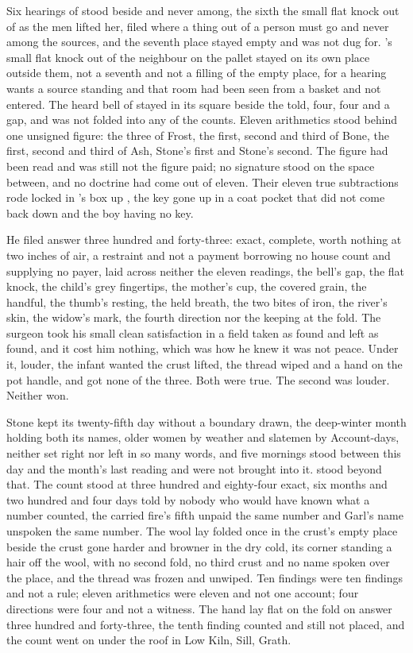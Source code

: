 Six hearings of  stood beside and never among, the sixth the small flat knock out of  as the men lifted her, filed where a thing out of a person must go and never among the sources, and the seventh place stayed empty and was not dug for. 's small flat knock out of the neighbour on the pallet stayed on its own place outside them, not a seventh and not a filling of the empty place, for a hearing wants a source standing and that room had been seen from a basket and not entered. The heard bell of  stayed in its square beside the told, four, four and a gap, and was not folded into any of the counts. Eleven arithmetics stood behind one unsigned figure: the three of Frost, the first, second and third of Bone, the first, second and third of Ash, Stone's first and Stone's second. The figure had been read and was still not the figure paid; no signature stood on the space between, and no doctrine had come out of eleven. Their eleven true subtractions rode locked in 's box up , the key gone up in a coat pocket that did not come back down and the boy having no key.

He filed answer three hundred and forty-three: exact, complete, worth nothing at two inches of air, a restraint and not a payment borrowing no house count and supplying no payer, laid across neither the eleven readings, the bell's gap, the flat knock, the child's grey fingertips, the mother's cup, the covered grain, the handful, the thumb's resting, the held breath, the two bites of iron, the river's skin, the widow's mark, the fourth direction nor the keeping at the fold. The surgeon took his small clean satisfaction in a field taken as found and left as found, and it cost him nothing, which was how he knew it was not peace. Under it, louder, the infant wanted the crust lifted, the thread wiped and a hand on the pot handle, and got none of the three. Both were true. The second was louder. Neither won.

Stone kept its twenty-fifth day without a boundary drawn, the deep-winter month holding both its names, older women by weather and slatemen by  Account-days, neither set right nor left in so many words, and five mornings stood between this day and the month's last reading and were not brought into it.  stood beyond that. The count stood at three hundred and eighty-four exact, six months and two hundred and four days told by nobody who would have known what a number counted, the carried fire's fifth unpaid the same number and Garl's name unspoken the same number. The wool lay folded once in the crust's empty place beside the crust gone harder and browner in the dry cold, its corner standing a hair off the wool, with no second fold, no third crust and no name spoken over the place, and the thread was frozen and unwiped. Ten findings were ten findings and not a rule; eleven arithmetics were eleven and not one account; four directions were four and not a witness. The hand lay flat on the fold on answer three hundred and forty-three, the tenth finding counted and still not placed, and the count went on under the roof in Low Kiln, Sill, Grath.
